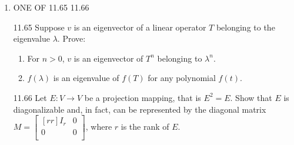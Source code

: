 \documentclass[12pt]{article}
\theoremstyle{definition}
\theoremstyle{plain}
\begin{document}
\begin{enumerate}
\item ONE OF 11.65 11.66
\item[11.65]Suppose $v$ is an eigenvector of a linear operator $T$ belonging to the eigenvalue $\lambda$. Prove:
	\begin{enumerate}
	\item For $n>0$, $v$ is an eigenvector of $T^n$ belonging to $\lambda^n$.
	\item $f(\lambda)$ is an eigenvalue of $f(T)$ for any polynomial $f(t)$.
	\end{enumerate}
\item[11.66]Let $E:V\rightarrow V$ be a projection mapping, that is $E^2=E$. Show that $E$ is diagonalizable and, in fact, can be represented by the diagonal matrix $M=\begin{bmatrix}[rr]I_r&0\\0&0\\\end{bmatrix}$, where $r$ is the rank of $E$.
	
\end{enumerate}	
\end{document}
